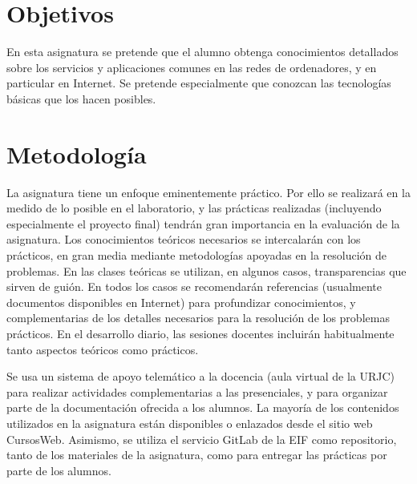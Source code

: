 \documentclass[a4paper,12pt]{article}
\begin{document}
\newpage

\section{Objetivos}

En esta asignatura se pretende que el alumno obtenga conocimientos detallados sobre los servicios y aplicaciones comunes en las redes de ordenadores, y en particular en Internet. Se pretende especialmente que conozcan las tecnologías básicas que los hacen posibles.

\section{Metodología}

La asignatura tiene un enfoque eminentemente práctico. Por ello se realizará en la medido de lo posible en el laboratorio, y las prácticas realizadas (incluyendo especialmente el proyecto final) tendrán gran importancia en la evaluación de la asignatura. Los conocimientos teóricos necesarios se intercalarán con los prácticos, en gran media mediante metodologías apoyadas en la resolución de problemas. En las clases teóricas se utilizan, en algunos casos, transparencias que sirven de guión. En todos los casos se recomendarán referencias (usualmente documentos disponibles en Internet) para profundizar conocimientos, y complementarias de los detalles necesarios para la resolución de los problemas prácticos. En el desarrollo diario, las sesiones docentes incluirán habitualmente tanto aspectos teóricos como prácticos.

Se usa un sistema de apoyo telemático a la docencia (aula virtual de la URJC) para realizar actividades complementarias a las presenciales, y para organizar parte de la documentación ofrecida a los alumnos. La mayoría de los contenidos utilizados en la asignatura están disponibles o enlazados desde el sitio web CursosWeb. Asimismo, se utiliza el servicio GitLab de la EIF como repositorio, tanto de los materiales de la asignatura, como para entregar las prácticas por parte de los alumnos.

\newpage

\end{document}
